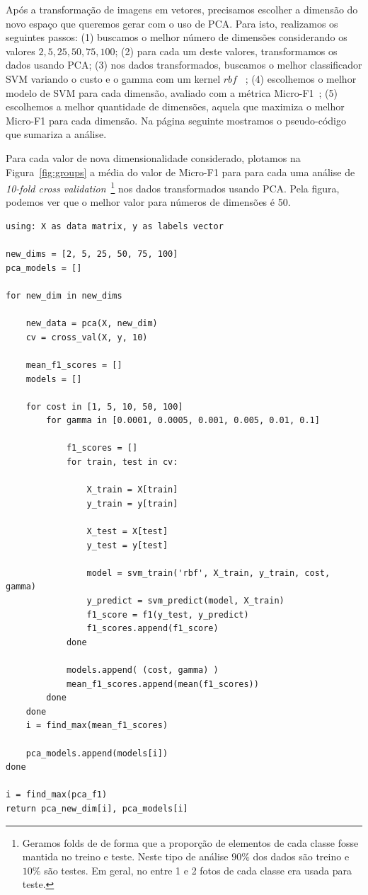 \documentclass[brazil,a4paper,12pt]{article}
\begin{document}
Após a transformação de imagens em vetores, precisamos escolher a dimensão
do novo espaço que queremos gerar com o uso de PCA. Para isto, realizamos
os seguintes passos: (1) buscamos o melhor número de dimensões considerando
os valores ${2, 5, 25, 50, 75, 100}$; (2) para cada um deste valores, 
transformamos os dados usando PCA; (3) nos dados transformados, buscamos
o melhor classificador SVM variando o custo e o gamma com um kernel $rbf$
~\cite{meira};
(4) escolhemos o melhor modelo de SVM para cada dimensão, avaliado com 
a métrica Micro-F1~\cite{meira}; (5) escolhemos a melhor 
quantidade de dimensões,
aquela que maximiza o melhor Micro-F1 para cada dimensão. 
Na página seguinte mostramos o pseudo-código que sumariza a análise.

Para cada valor de nova dimensionalidade considerado, plotamos na 
Figura~\ref{fig:groups} a média do valor de Micro-F1 para para cada
uma análise de {\it 10-fold cross validation}~\footnote{Geramos folds de de forma
que a proporção de elementos de cada classe fosse mantida no treino e teste. 
Neste tipo de análise $90\%$ dos dados são treino e $10\%$ são testes. Em geral,
no entre 1 e 2 fotos de cada classe era usada para teste.} 
nos dados transformados usando PCA. 
Pela figura, podemos ver que o melhor valor para números de dimensões é 50.

\begin{verbatim}
using: X as data matrix, y as labels vector

new_dims = [2, 5, 25, 50, 75, 100]
pca_models = []

for new_dim in new_dims
    
    new_data = pca(X, new_dim)
    cv = cross_val(X, y, 10)

    mean_f1_scores = []
    models = []

    for cost in [1, 5, 10, 50, 100]
        for gamma in [0.0001, 0.0005, 0.001, 0.005, 0.01, 0.1]

            f1_scores = []
            for train, test in cv:

                X_train = X[train]
                y_train = y[train]
        
                X_test = X[test]
                y_test = y[test]
        
                model = svm_train('rbf', X_train, y_train, cost, gamma)
                y_predict = svm_predict(model, X_train)
                f1_score = f1(y_test, y_predict)
                f1_scores.append(f1_score)
            done

            models.append( (cost, gamma) )
            mean_f1_scores.append(mean(f1_scores))
        done
    done
    i = find_max(mean_f1_scores)

    pca_models.append(models[i])
done

i = find_max(pca_f1)
return pca_new_dim[i], pca_models[i]

\end{verbatim}
\end{document}
